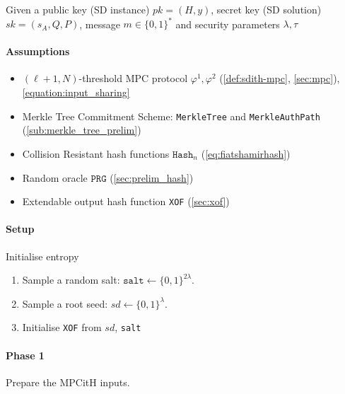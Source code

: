 \documentclass[11pt]{report}
\theoremstyle{definition}
\theoremstyle{plain}
\begin{document}
\begin{protocol}\label{def:sdith-sign}
  \setlength{\parindent}{0pt}
  \setlength{\parskip}{5pt}
  \titlespacing*{\paragraph}{0pt}{1pt}{1em}
  Given a public key (SD instance) $pk = (H, y)$, secret key (SD solution) $sk = (s_A, Q, P)$, message $m \in \{0,1\}^*$ and security parameters $\lambda, \tau$

  \paragraph{Assumptions}

  \begin{itemize}[itemsep=0pt, topsep=0pt, parsep=0pt]
    \item $(\ell + 1, N)$-threshold MPC protocol $\varphi^1, \varphi^2$ (\autoref{def:sdith-mpc}, \autoref{sec:mpc}), \autoref{equation:input_sharing}
    \item Merkle Tree Commitment Scheme: \texttt{MerkleTree} and \texttt{MerkleAuthPath} (\autoref{sub:merkle_tree_prelim})
    \item Collision Resistant hash functions $\texttt{Hash}_n$ (\autoref{eq:fiatshamirhash})
    \item Random oracle $\texttt{PRG}$ (\autoref{sec:prelim_hash})
    \item Extendable output hash function \texttt{XOF} (\autoref{sec:xof})
  \end{itemize}

  \paragraph{Setup} Initialise entropy

  \begin{enumerate}[itemsep=0pt, topsep=0pt, parsep=0pt]
    \item Sample a random salt: $\texttt{salt} \leftarrow \{0, 1\}^{2\lambda}$.
    \item Sample a root seed: $sd \leftarrow \{0, 1\}^{\lambda}$.
    \item Initialise \texttt{XOF} from $sd$, \texttt{salt}
  \end{enumerate}
  \paragraph{Phase 1} Prepare the MPCitH inputs.


\end{protocol}
\end{document}
